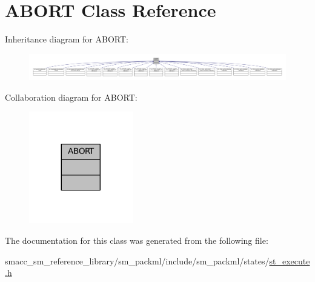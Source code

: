 \hypertarget{classABORT}{}\section{A\+B\+O\+RT Class Reference}
\label{classABORT}


Inheritance diagram for A\+B\+O\+RT\+:
\nopagebreak
\begin{figure}[H]
\begin{center}
\leavevmode
\includegraphics[width=350pt]{classABORT__inherit__graph}
\end{center}
\end{figure}


Collaboration diagram for A\+B\+O\+RT\+:
\nopagebreak
\begin{figure}[H]
\begin{center}
\leavevmode
\includegraphics[width=128pt]{classABORT__coll__graph}
\end{center}
\end{figure}


The documentation for this class was generated from the following file\+:\begin{DoxyCompactItemize}
\item 
smacc\+\_\+sm\+\_\+reference\+\_\+library/sm\+\_\+packml/include/sm\+\_\+packml/states/\hyperlink{st__execute_8h}{st\+\_\+execute.\+h}\end{DoxyCompactItemize}
